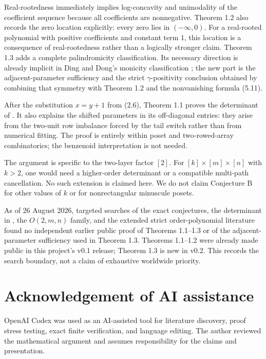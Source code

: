 \documentclass[11pt]{article}
\numberwithin{equation}{section}
\begin{document}
Real-rootedness immediately implies log-concavity and unimodality of the
coefficient sequence because all coefficients are nonnegative. Theorem 1.2 also
records the zero location explicitly: every zero lies in $(-\infty,0)$. For a
real-rooted polynomial with positive coefficients and constant term $1$, this
location is a consequence of real-rootedness rather than a logically stronger
claim. Theorem 1.3 adds a complete palindromicity classification. Its necessary
direction is already implicit in Ding and Dong's monicity classification
\cite[Lemma~2.3(a)]{ding2019}; the new part is the adjacent-parameter sufficiency and the
strict $\gamma$-positivity conclusion obtained by combining that symmetry with
Theorem 1.2 and the nonvanishing formula (5.11).

After the substitution $x=y+1$ from (2.6), Theorem 1.1 proves the determinant
of \cite{he2021}. It also explains the shifted parameters in its off-diagonal entries:
they arise from the two-unit row imbalance forced by the tail switch rather than
from numerical fitting. The proof is entirely within poset and two-rowed-array
combinatorics; the benzenoid interpretation is not needed.

The argument is specific to the two-layer factor $[2]$. For
$[k]\times[m]\times[n]$ with $k>2$, one would need a higher-order determinant or
a compatible multi-path cancellation. No such extension is claimed here. We
do not claim Conjecture B for other values of $k$ or for nonrectangular
minuscule posets.

As of 26 August 2026, targeted searches of the exact conjectures, the determinant
in \cite{he2021}, the $O(2,m,n)$ family, and the extended strict order-polynomial literature
found no independent earlier public proof of Theorems 1.1--1.3 or of the
adjacent-parameter sufficiency used in Theorem 1.3. Theorems 1.1--1.2 were
already made public in this project's v0.1 release; Theorem 1.3 is new in v0.2.
This records the search boundary, not a claim of exhaustive worldwide priority.

\section*{Acknowledgement of AI assistance}


OpenAI Codex was used as an AI-assisted tool for literature discovery, proof
stress testing, exact finite verification, and language editing. The author
reviewed the mathematical argument and assumes responsibility for the claims and
presentation.
\end{document}
